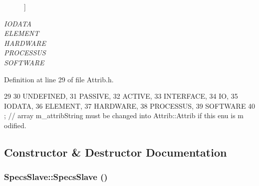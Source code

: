 \begin{Desc}
\begin{description}
{}]\item[{\em 
\hypertarget{classAttrib_a69e171d7cc6417835a5a306d3c764235a0af3b0d0ac323c1704e6c69cf90add28}{
IODATA}
\label{classAttrib_a69e171d7cc6417835a5a306d3c764235a0af3b0d0ac323c1704e6c69cf90add28}
}]\item[{\em 
\hypertarget{classAttrib_a69e171d7cc6417835a5a306d3c764235a7788bc5dd333fd8ce18562b269c9dab1}{
ELEMENT}
\label{classAttrib_a69e171d7cc6417835a5a306d3c764235a7788bc5dd333fd8ce18562b269c9dab1}
}]\item[{\em 
\hypertarget{classAttrib_a69e171d7cc6417835a5a306d3c764235a61ceb22149f365f1780d18f9d1459423}{
HARDWARE}
\label{classAttrib_a69e171d7cc6417835a5a306d3c764235a61ceb22149f365f1780d18f9d1459423}
}]\item[{\em 
\hypertarget{classAttrib_a69e171d7cc6417835a5a306d3c764235a75250e29692496e73effca2c0330977f}{
PROCESSUS}
\label{classAttrib_a69e171d7cc6417835a5a306d3c764235a75250e29692496e73effca2c0330977f}
}]\item[{\em 
\hypertarget{classAttrib_a69e171d7cc6417835a5a306d3c764235a103a67cd0b8f07ef478fa45d4356e27b}{
SOFTWARE}
\label{classAttrib_a69e171d7cc6417835a5a306d3c764235a103a67cd0b8f07ef478fa45d4356e27b}
}]\end{description}
\end{Desc}



Definition at line 29 of file Attrib.h.


\begin{DoxyCode}
29                 {
30     UNDEFINED,
31     PASSIVE,
32     ACTIVE,
33     INTERFACE,
34     IO,
35     IODATA,
36     ELEMENT,
37     HARDWARE,
38     PROCESSUS,
39     SOFTWARE 
40   }; // array m_attribString must be changed into Attrib::Attrib if this enu is m
      odified. 
\end{DoxyCode}


\subsection{Constructor \& Destructor Documentation}
\hypertarget{classSpecsSlave_a4170ce73e2fd5ce2b8a7b8ef55226556}{
\subsubsection[{SpecsSlave}]{\setlength{\rightskip}{0pt plus 5cm}SpecsSlave::SpecsSlave ()}}
\label{classSpecsSlave_a4170ce73e2fd5ce2b8a7b8ef55226556}


